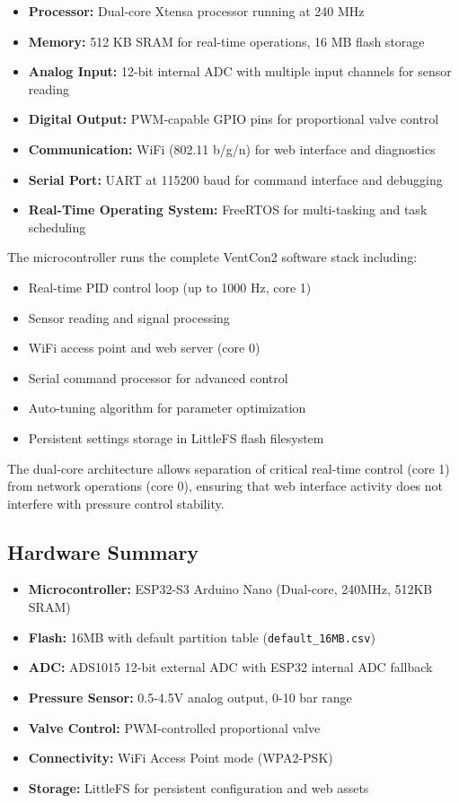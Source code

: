     \begin{itemize}
        \item \textbf{Processor:} Dual-core Xtensa processor running at 240 MHz
        \item \textbf{Memory:} 512 KB SRAM for real-time operations, 16 MB flash storage
        \item \textbf{Analog Input:} 12-bit internal ADC with multiple input channels for sensor reading
        \item \textbf{Digital Output:} PWM-capable GPIO pins for proportional valve control
        \item \textbf{Communication:} WiFi (802.11 b/g/n) for web interface and diagnostics
        \item \textbf{Serial Port:} UART at 115200 baud for command interface and debugging
        \item \textbf{Real-Time Operating System:} FreeRTOS for multi-tasking and task scheduling
    \end{itemize}

The microcontroller runs the complete VentCon2 software stack including:

    \begin{itemize}
        \item Real-time PID control loop (up to 1000 Hz, core 1)
        \item Sensor reading and signal processing
        \item WiFi access point and web server (core 0)
        \item Serial command processor for advanced control
        \item Auto-tuning algorithm for parameter optimization
        \item Persistent settings storage in LittleFS flash filesystem
    \end{itemize}

The dual-core architecture allows separation of critical real-time control (core 1) from network operations (core 0), ensuring that web interface activity does not interfere with pressure control stability.

\subsection{Hardware Summary}
\begin{itemize}
    \item \textbf{Microcontroller:} ESP32-S3 Arduino Nano (Dual-core, 240MHz, 512KB SRAM)
    \item \textbf{Flash:} 16MB with default partition table (\texttt{default\_16MB.csv})
    \item \textbf{ADC:} ADS1015 12-bit external ADC with ESP32 internal ADC fallback
    \item \textbf{Pressure Sensor:} 0.5-4.5V analog output, 0-10 bar range
    \item \textbf{Valve Control:} PWM-controlled proportional valve
    \item \textbf{Connectivity:} WiFi Access Point mode (WPA2-PSK)
    \item \textbf{Storage:} LittleFS for persistent configuration and web assets
\end{itemize}
